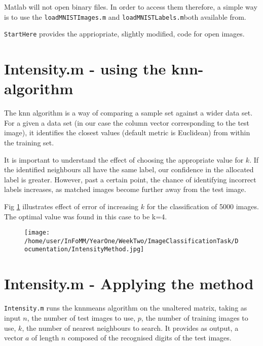 \documentclass[12pt]{article}
\begin{document}
Matlab will not open binary files. In order to access them therefore,  a simple way is to use the \texttt{loadMNISTImages.m} and \texttt{loadMNISTLabels.m}both available from\cite{load}.

\texttt{StartHere} provides the appriopriate, slightly modified, code for open images.

\section{Intensity.m - using the knn-algorithm}
The knn algorithm is a way of comparing a sample set against a wider data set. For a given a data set (in our case the column vector corresponding to the test image), it identifies the closest values (default metric is Euclidean) from within the training set.

It is important to understand the effect of choosing the appropriate value for \(k\). If the identified neighbours all have the same label, our confidence in the allocated label is greater. However, past a certain point, the chance of identifying incorrect labels increases, as matched images become further away from the test image.

Fig \ref{fig:IntensityMethod} illustrates effect of error of increasing \(k\) for the classification of 5000 images. The optimal value was found in this case to be k=4.

\begin{figure}[ht]
  \texttt{[image: /home/user/InFoMM/YearOne/WeekTwo/ImageClassificationTask/Documentation/IntensityMethod.jpg]}
  \label{fig:IntensityMethod}
\end{figure}

\section{Intensity.m - Applying the method}

\texttt{Intensity.m} runs the knnmeans algorithm on the unaltered matrix, taking as input \(n\), the number of test images to use, \(p\), the number of training images to use, \(k\), the number of nearest neighbours to search. It provides as output, a vector \(a\) of length \(n\) composed of the recognised digits of the test images. 
\end{document}
